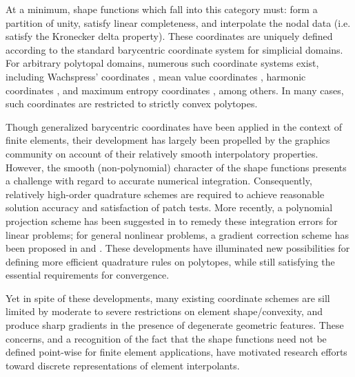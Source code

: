 		At a minimum, shape functions which fall into this category must: form a partition of unity, satisfy linear completeness, and interpolate the nodal data (i.e. satisfy the Kronecker delta property). These coordinates are uniquely defined according to the standard barycentric coordinate system for simplicial domains. For arbitrary polytopal domains, numerous such coordinate systems exist, including Wachspress' coordinates \cite{Wachspress:75}, mean value coordinates \cite{Floater:03}, harmonic coordinates \cite{Joshi:07}, and maximum entropy coordinates \cite{Sukumar:04}, among others. In many cases, such coordinates are restricted to strictly convex polytopes.
			
		Though generalized barycentric coordinates have been applied in the context of finite elements, their development has largely been propelled by the graphics community on account of their relatively smooth interpolatory properties. However, the smooth (non-polynomial) character of the shape functions presents a challenge with regard to accurate numerical integration. Consequently, relatively high-order quadrature schemes are required to achieve reasonable solution accuracy and satisfaction of patch tests. More recently, a polynomial projection scheme has been suggested in \cite{Talischi:14} to remedy these integration errors for linear problems; for general nonlinear problems, a gradient correction scheme has been proposed in \cite{Talischi:15} and \cite{Chi:16}. These developments have illuminated new possibilities for defining more efficient quadrature rules on polytopes, while still satisfying the essential requirements for convergence.
		
		Yet in spite of these developments, many existing coordinate schemes are sill limited by moderate to severe restrictions on element shape/convexity, and produce sharp gradients in the presence of degenerate geometric features. These concerns, and a recognition of the fact that the shape functions need not be defined point-wise for finite element applications, have motivated research efforts toward discrete representations of element interpolants.

